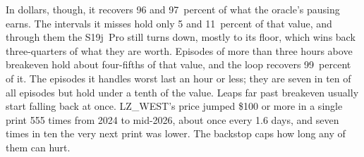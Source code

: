 In dollars, though, it recovers 96 and 97~percent of what the oracle's pausing earns. The intervals it misses hold only 5 and 11~percent of that value, and through them the S19j~Pro still turns down, mostly to its floor, which wins back three-quarters of what they are worth. %
Episodes of more than three hours above breakeven hold about four-fifths of that value, and the loop recovers 99~percent of it. The episodes it handles worst last an hour or less; they are seven in ten of all episodes but hold under a tenth of the value. %
Leaps far past breakeven usually start falling back at once. LZ\_WEST's price jumped \$100 or more in a single print 555 times from 2024 to mid-2026, about once every 1.6 days, and seven times in ten the very next print was lower. The backstop caps how long any of them can hurt. %

